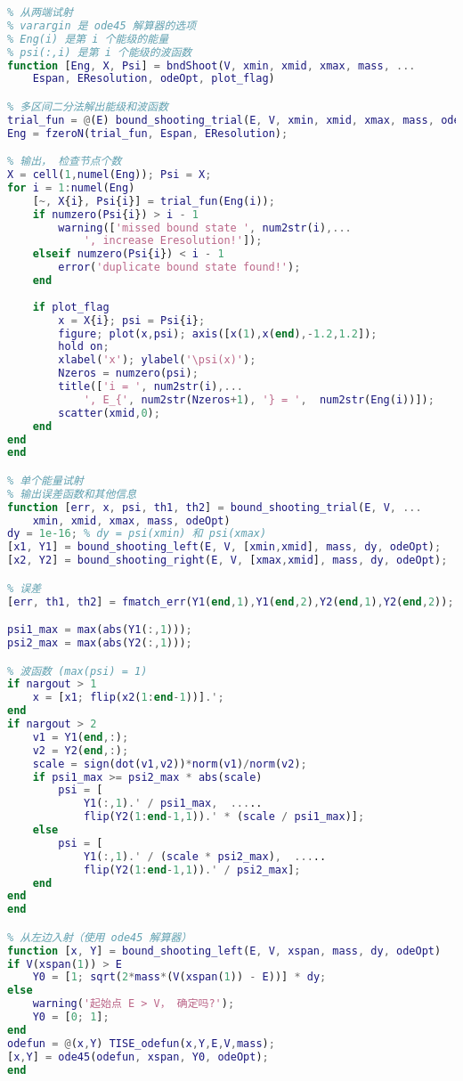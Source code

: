 \begin{lstlisting}[language=matlab, caption=bndShoot.m]
% 求解一维定态薛定谔方程的能级
% 从两端试射
% varargin 是 ode45 解算器的选项
% Eng(i) 是第 i 个能级的能量
% psi(:,i) 是第 i 个能级的波函数
function [Eng, X, Psi] = bndShoot(V, xmin, xmid, xmax, mass, ...
    Espan, EResolution, odeOpt, plot_flag)

% 多区间二分法解出能级和波函数
trial_fun = @(E) bound_shooting_trial(E, V, xmin, xmid, xmax, mass, odeOpt);
Eng = fzeroN(trial_fun, Espan, EResolution);

% 输出， 检查节点个数
X = cell(1,numel(Eng)); Psi = X;
for i = 1:numel(Eng)
    [~, X{i}, Psi{i}] = trial_fun(Eng(i));
    if numzero(Psi{i}) > i - 1
        warning(['missed bound state ', num2str(i),...
            ', increase Eresolution!']);
    elseif numzero(Psi{i}) < i - 1
        error('duplicate bound state found!');
    end
    
    if plot_flag
        x = X{i}; psi = Psi{i};
        figure; plot(x,psi); axis([x(1),x(end),-1.2,1.2]);
        hold on;
        xlabel('x'); ylabel('\psi(x)');
        Nzeros = numzero(psi);
        title(['i = ', num2str(i),...
            ', E_{', num2str(Nzeros+1), '} = ',  num2str(Eng(i))]);
        scatter(xmid,0);
    end
end
end

% 单个能量试射
% 输出误差函数和其他信息
function [err, x, psi, th1, th2] = bound_shooting_trial(E, V, ...
    xmin, xmid, xmax, mass, odeOpt)
dy = 1e-16; % dy = psi(xmin) 和 psi(xmax)
[x1, Y1] = bound_shooting_left(E, V, [xmin,xmid], mass, dy, odeOpt);
[x2, Y2] = bound_shooting_right(E, V, [xmax,xmid], mass, dy, odeOpt);

% 误差
[err, th1, th2] = fmatch_err(Y1(end,1),Y1(end,2),Y2(end,1),Y2(end,2));

psi1_max = max(abs(Y1(:,1)));
psi2_max = max(abs(Y2(:,1)));

% 波函数 (max(psi) = 1)
if nargout > 1
    x = [x1; flip(x2(1:end-1))].';
end
if nargout > 2
    v1 = Y1(end,:);
    v2 = Y2(end,:);
    scale = sign(dot(v1,v2))*norm(v1)/norm(v2);
    if psi1_max >= psi2_max * abs(scale)
        psi = [
            Y1(:,1).' / psi1_max,  .....
            flip(Y2(1:end-1,1)).' * (scale / psi1_max)];
    else
        psi = [
            Y1(:,1).' / (scale * psi2_max),  .....
            flip(Y2(1:end-1,1)).' / psi2_max];
    end
end
end

% 从左边入射（使用 ode45 解算器）
function [x, Y] = bound_shooting_left(E, V, xspan, mass, dy, odeOpt)
if V(xspan(1)) > E
    Y0 = [1; sqrt(2*mass*(V(xspan(1)) - E))] * dy;
else
    warning('起始点 E > V， 确定吗?');
    Y0 = [0; 1];
end
odefun = @(x,Y) TISE_odefun(x,Y,E,V,mass);
[x,Y] = ode45(odefun, xspan, Y0, odeOpt);
end


\end{lstlisting}

